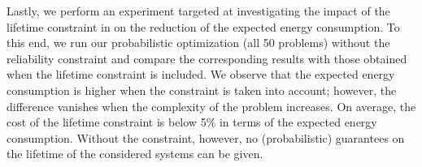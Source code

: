 Lastly, we perform an experiment targeted at investigating the impact of the
lifetime constraint in  on the reduction of
the expected energy consumption. To this end, we run our probabilistic
optimization (all 50 problems) without the reliability constraint and compare
the corresponding results with those obtained when the lifetime constraint is
included. We observe that the expected energy consumption is higher when the
constraint is taken into account; however, the difference vanishes when the
complexity of the problem increases. On average, the cost of the lifetime
constraint is below 5\% in terms of the expected energy consumption. Without the
constraint, however, no (probabilistic) guarantees on the lifetime of the
considered systems can be given.
